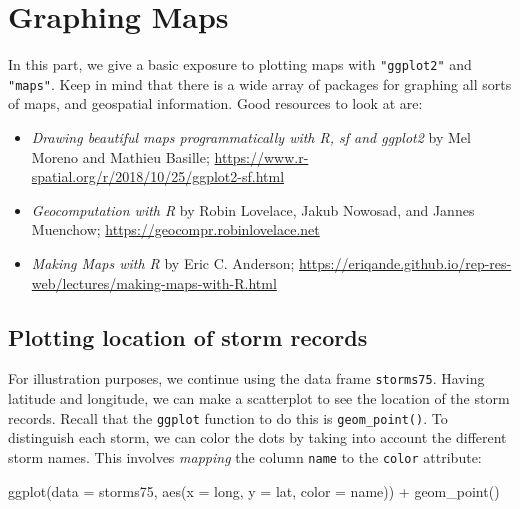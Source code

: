 \documentclass[
]{book}
\newenvironment{Shaded}{\begin{snugshade}}{\end{snugshade}}
\newcommand{\AttributeTok}[1]{\textcolor[rgb]{0.77,0.63,0.00}{#1}}
\newcommand{\FunctionTok}[1]{\textcolor[rgb]{0.00,0.00,0.00}{#1}}
\newcommand{\NormalTok}[1]{#1}
\newcommand{\SpecialCharTok}[1]{\textcolor[rgb]{0.00,0.00,0.00}{#1}}
\begin{document}
\hypertarget{graphing-maps}{%
\section{Graphing Maps}\label{graphing-maps}}

In this part, we give a basic exposure to plotting maps with \texttt{"ggplot2"}
and \texttt{"maps"}. Keep in mind that there is a wide array of packages for graphing
all sorts of maps, and geospatial information. Good resources to look at are:

\begin{itemize}
\item
  \emph{Drawing beautiful maps programmatically with R, sf and ggplot2} by Mel Moreno and Mathieu Basille; \url{https://www.r-spatial.org/r/2018/10/25/ggplot2-sf.html}
\item
  \emph{Geocomputation with R} by Robin Lovelace, Jakub Nowosad, and Jannes Muenchow; \url{https://geocompr.robinlovelace.net}
\item
  \emph{Making Maps with R} by Eric C. Anderson; \url{https://eriqande.github.io/rep-res-web/lectures/making-maps-with-R.html}
\end{itemize}

\hypertarget{plotting-location-of-storm-records}{%
\subsection{Plotting location of storm records}\label{plotting-location-of-storm-records}}

For illustration purposes, we continue using the data frame \texttt{storms75}. Having
latitude and longitude, we can make a scatterplot to see the location of
the storm records. Recall that the \texttt{ggplot} function to do this is
\texttt{geom\_point()}. To distinguish each storm, we can color the
dots by taking into account the different storm names. This involves \emph{mapping}
the column \texttt{name} to the \texttt{color} attribute:

\begin{Shaded}
\begin{Highlighting}[]
\FunctionTok{ggplot}\NormalTok{(}\AttributeTok{data =}\NormalTok{ storms75, }\FunctionTok{aes}\NormalTok{(}\AttributeTok{x =}\NormalTok{ long, }\AttributeTok{y =}\NormalTok{ lat, }\AttributeTok{color =}\NormalTok{ name)) }\SpecialCharTok{+} 
  \FunctionTok{geom\_point}\NormalTok{()}
\end{Highlighting}
\end{Shaded}
\end{document}
